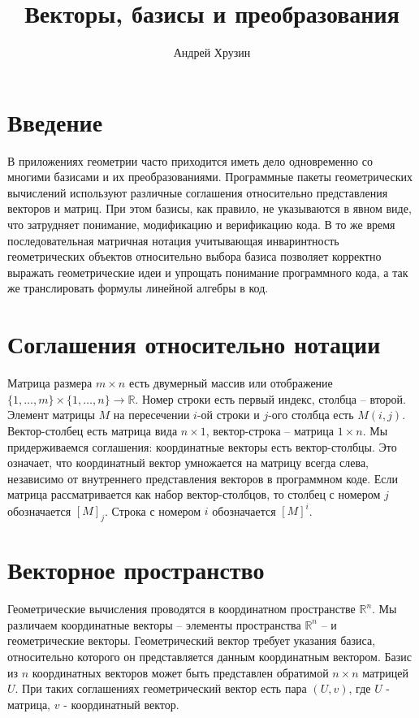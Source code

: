 \documentclass[a4paper]{article}
\author{Андрей Хрузин}
\title{Векторы, базисы и преобразования}
\begin{document}
\maketitle

\section{Введение}
В приложениях геометрии часто приходится иметь дело одновременно со многими базисами и их преобразованиями. Программные пакеты геометрических вычислений используют различные соглашения относительно представления векторов и матриц. При этом базисы, как правило, не указываются в явном виде, что затрудняет понимание, модификацию и верификацию кода. В то же время последовательная матричная нотация учитывающая инваринтность геометрических объектов относительно выбора базиса позволяет корректно выражать геометрические идеи и упрощать понимание программного кода, а так же транслировать формулы линейной алгебры в код.

\section{Соглашения относительно нотации}
Матрица размера $m \times n$ есть двумерный массив или отображение $\{ 1, \dots, m \} \times \{ 1, \dots, n \} \to \mathbb R$. Номер строки есть первый индекс, столбца -- второй. Элемент матрицы $M$ на пересечении $i$-ой строки и $j$-ого столбца есть $M(i, j)$. Вектор-столбец есть матрица вида $n \times 1$, вектор-строка -- матрица $1 \times n$. Мы придерживаемся соглашения: координатные векторы есть вектор-столбцы. Это означает, что координатный вектор умножается на матрицу всегда слева, независимо от внутреннего представления векторов в программном коде.  Если матрица рассматривается как набор вектор-столбцов, то столбец с номером $j$ обозначается $[ M ]_j$. Строка с номером $i$ обозначается $[M]^i$.


\section{Векторное пространство}
Геометрические вычисления проводятся в координатном пространстве $\mathbb R^n$. Мы различаем координатные векторы -- элементы пространства $\mathbb R^n$ -- и геометрические векторы. Геометрический вектор требует указания базиса, относительно которого он представляется данным координатным вектором. Базис из $n$ координатных векторов может быть представлен обратимой $n \times n$ матрицей $U$. При таких соглашениях геометрический вектор есть пара $(U, v)$, где $U$ - матрица, $v$ - координатный вектор.
\end{document}
